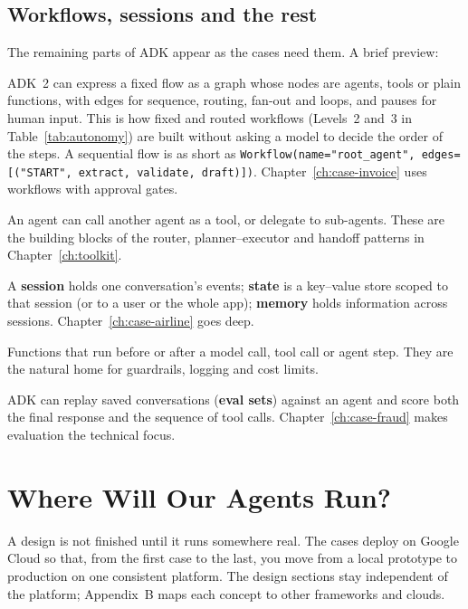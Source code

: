 \subsection{Workflows, sessions and the rest}

The remaining parts of ADK appear as the cases need them. A brief preview:
\begin{description}[leftmargin=1em,itemsep=2pt]
  \item[Workflows.] ADK~2 can express a fixed flow as a graph whose nodes are agents, tools or plain functions, with edges for sequence, routing, fan-out and loops, and pauses for human input. This is how fixed and routed workflows (Levels~2 and~3 in Table~\ref{tab:autonomy}) are built without asking a model to decide the order of the steps. A sequential flow is as short as \texttt{Workflow(name="root\_agent", edges=[("START", extract, validate, draft)])}. Chapter~\ref{ch:case-invoice} uses workflows with approval gates.
  \item[Agents as tools and sub-agents.] An agent can call another agent as a tool, or delegate to sub-agents. These are the building blocks of the router, planner--executor and handoff patterns in Chapter~\ref{ch:toolkit}.
  \item[Sessions, state and memory.] A \textbf{session} holds one conversation's events; \textbf{state} is a key--value store scoped to that session (or to a user or the whole app); \textbf{memory} holds information across sessions. Chapter~\ref{ch:case-airline} goes deep.
  \item[Callbacks.] Functions that run before or after a model call, tool call or agent step. They are the natural home for guardrails, logging and cost limits.
  \item[Evaluation.] ADK can replay saved conversations (\textbf{eval sets}) against an agent and score both the final response and the sequence of tool calls. Chapter~\ref{ch:case-fraud} makes evaluation the technical focus.
\end{description}

\section{Where Will Our Agents Run?}
\label{sec:gcp}

A design is not finished until it runs somewhere real. The cases deploy on Google Cloud so that, from the first case to the last, you move from a local prototype to production on one consistent platform. The design sections stay independent of the platform; Appendix~B maps each concept to other frameworks and clouds.


